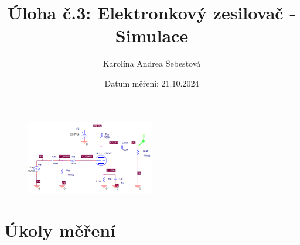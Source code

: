 \documentclass[a4paper, czech]{article}
\title{Úloha č.3: Elektronkový zesilovač - Simulace}
\author{Karolína Andrea Šebestová}
\date{Datum měření: 21.10.2024}
\begin{document}
\maketitle

\begin{figure}[H]
    \centering
    \includegraphics[width=0.5\textwidth]{schema.png}
\end{figure}

\section{Úkoly měření}
\end{document}

